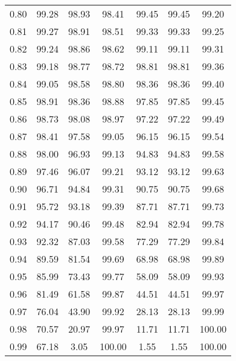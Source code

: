 \begin{tabular}{|c|c|c|c|c|c|c|}
      0.80 &     99.28 &     98.93 &      98.41 &   99.45 &      99.45 &         99.20 \\
      0.81 &     99.27 &     98.91 &      98.51 &   99.33 &      99.33 &         99.25 \\
      0.82 &     99.24 &     98.86 &      98.62 &   99.11 &      99.11 &         99.31 \\
      0.83 &     99.18 &     98.77 &      98.72 &   98.81 &      98.81 &         99.36 \\
      0.84 &     99.05 &     98.58 &      98.80 &   98.36 &      98.36 &         99.40 \\
      0.85 &     98.91 &     98.36 &      98.88 &   97.85 &      97.85 &         99.45 \\
      0.86 &     98.73 &     98.08 &      98.97 &   97.22 &      97.22 &         99.49 \\
      0.87 &     98.41 &     97.58 &      99.05 &   96.15 &      96.15 &         99.54 \\
      0.88 &     98.00 &     96.93 &      99.13 &   94.83 &      94.83 &         99.58 \\
      0.89 &     97.46 &     96.07 &      99.21 &   93.12 &      93.12 &         99.63 \\
      0.90 &     96.71 &     94.84 &      99.31 &   90.75 &      90.75 &         99.68 \\
      0.91 &     95.72 &     93.18 &      99.39 &   87.71 &      87.71 &         99.73 \\
      0.92 &     94.17 &     90.46 &      99.48 &   82.94 &      82.94 &         99.78 \\
      0.93 &     92.32 &     87.03 &      99.58 &   77.29 &      77.29 &         99.84 \\
      0.94 &     89.59 &     81.54 &      99.69 &   68.98 &      68.98 &         99.89 \\
      0.95 &     85.99 &     73.43 &      99.77 &   58.09 &      58.09 &         99.93 \\
      0.96 &     81.49 &     61.58 &      99.87 &   44.51 &      44.51 &         99.97 \\
      0.97 &     76.04 &     43.90 &      99.92 &   28.13 &      28.13 &         99.99 \\
      0.98 &     70.57 &     20.97 &      99.97 &   11.71 &      11.71 &        100.00 \\
      0.99 &     67.18 &      3.05 &     100.00 &    1.55 &       1.55 &        100.00 \\
\bottomrule
\end{tabular}
